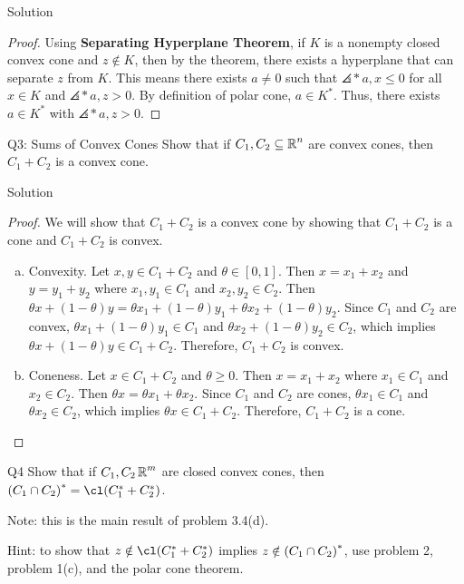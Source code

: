 \documentclass{article}
\begin{document}
\begin{solution}
    {Solution}
    \begin{proof}
        Using \textbf{Separating Hyperplane Theorem}, if $K$ is a nonempty closed convex cone and $z\notin K$, then by the theorem, there exists a hyperplane that can separate $z$ from $K$. This means there exists $a\neq 0$ such that $\angles*{a, x}\leq 0$ for all $x\in K$ and $\angles*{a, z}>0$. By definition of polar cone, $a\in K^*$. Thus, there exists $a\in K^*$ with $\angles*{a,z}>0$.
    \end{proof}
\end{solution}

\begin{problem}
    {Q3: Sums of Convex Cones}
    Show that if $C_1, C_2\subseteq \R^n$ are convex cones, then $C_1+C_2$ is a convex cone.
\end{problem}

\begin{solution}
    {Solution}
    \begin{proof}
    We will show that $C_1+C_2$ is a convex cone by showing that $C_1+C_2$ is a cone and $C_1+C_2$ is convex.
    \begin{enumerate}[(a)]
        \item Convexity. {
                Let $x,y\in C_1+C_2$ and $\theta\in[0,1]$. Then $x=x_1+x_2$ and $y=y_1+y_2$ where $x_1,y_1\in C_1$ and $x_2,y_2\in C_2$. Then $\theta x+(1-\theta)y=\theta x_1+(1-\theta)y_1+\theta x_2+(1-\theta)y_2$. Since $C_1$ and $C_2$ are convex, $\theta x_1+(1-\theta)y_1\in C_1$ and $\theta x_2+(1-\theta)y_2\in C_2$, which implies $\theta x+(1-\theta)y\in C_1+C_2$. Therefore, $C_1+C_2$ is convex.
        }
        \item Coneness. {
                Let $x\in C_1+C_2$ and $\theta\geq 0$. Then $x=x_1+x_2$ where $x_1\in C_1$ and $x_2\in C_2$. Then $\theta x=\theta x_1+\theta x_2$. Since $C_1$ and $C_2$ are cones, $\theta x_1\in C_1$ and $\theta x_2\in C_2$, which implies $\theta x\in C_1+C_2$. Therefore, $C_1+C_2$ is a cone.
        }
    \end{enumerate}
\end{proof}
\end{solution}

\begin{problem}
    {Q4}
    Show that if $C_1, C_2 \R^m$ are closed convex cones, then $\parens*{C_1\cap C_2}^*=\cl \parens*{C_1^*+C_2^*}$.

    Note: this is the main result of problem 3.4(d).

    Hint: to show that $z\notin\cl(C_1^*+C_2^*)$ implies $z\notin \parens*{C_1\cap C_2}^*$, use problem 2, problem 1(c), and the polar cone theorem.
\end{problem}
\end{document}
